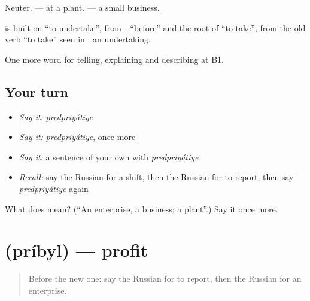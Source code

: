 Neuter. \emph{ } — at a plant. \emph{ } — a small business.

\begin{cousinweb}
\textbf{} is built on \emph{} \textquotedblleft{}to undertake\textquotedblright{}, from \emph{-} \textquotedblleft{}before\textquotedblright{} and the root of \emph{} \textquotedblleft{}to take\textquotedblright{}, from the old verb \textquotedblleft{}to take\textquotedblright{} seen in \emph{}: an undertaking.
\end{cousinweb}

\begin{grammarlens}[title={What you've built}]
One more word for telling, explaining and describing at B1.
\end{grammarlens}

\subsection*{Your turn}
\begin{itemize}
\raggedright
  \item \emph{Say it:} \emph{predpriyátiye}
  \item \emph{Say it:} \emph{predpriyátiye}, once more
  \item \emph{Say it:} a sentence of your own with \emph{predpriyátiye}
  \item \emph{Recall:} say the Russian for a shift, then the Russian for to report, then say \emph{predpriyátiye} again
\end{itemize}

\begin{tcolorbox}[breakable,colback=teal!4,colframe=teal!35!black,title={Before you move on}]
What does  mean? (\textquotedblleft{}An enterprise, a business; a plant\textquotedblright{}.) Say it once more.
\end{tcolorbox}
\section[\texorpdfstring{\ru{прибыль} (príbyl)}{прибыль (príbyl)}]{ (príbyl) — profit}

\label{lesson:RU-C361-pribyl}



\begin{quote}
Before the new one: say the Russian for to report, then the Russian for an enterprise.
\end{quote}

